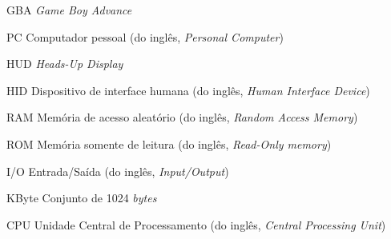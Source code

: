 \begin{siglas}
  \item[GBA] \textit{Game Boy Advance}
  \item[PC] Computador pessoal (do inglês, \textit{Personal Computer})
  \item[HUD] \textit{Heads-Up Display}
  \item[HID] Dispositivo de interface humana (do inglês, \textit{Human Interface Device})
  \item[RAM] Memória de acesso aleatório (do inglês, \textit{Random Access Memory})
  \item[ROM] Memória somente de leitura (do inglês, \textit{Read-Only memory})
  \item[I/O] Entrada/Saída (do inglês, \textit{Input/Output})
  \item[KByte] Conjunto de 1024 \textit{bytes}
  \item[CPU] Unidade Central de Processamento (do inglês, \textit{Central Processing Unit})
\end{siglas}
